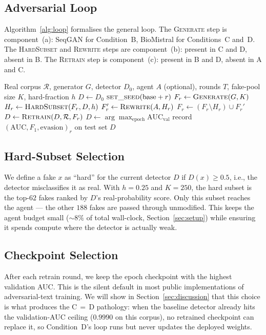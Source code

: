 \documentclass[conference]{IEEEtran}
\begin{document}
\subsection{Adversarial Loop}
\label{ssec:loop}

Algorithm~\ref{alg:loop} formalises the general loop. The
\textsc{Generate} step is component~(a): SeqGAN for Condition~B,
BioMistral for Conditions~C and~D. The \textsc{HardSubset} and
\textsc{Rewrite} steps are component~(b): present in C and D, absent in
B. The \textsc{Retrain} step is component~(c): present in B and D,
absent in A and C.

\begin{algorithm}[t]
\caption{BioShield adversarial loop}
\label{alg:loop}
\begin{algorithmic}[1]
\REQUIRE Real corpus $\mathcal{R}$, generator $G$, detector $D_0$,
agent $A$ (optional), rounds $T$, fake-pool size $K$, hard-fraction $h$
\STATE $D \leftarrow D_0$  
  \STATE $\textsc{set\_seed}(\text{base} + r)$
  \STATE $F_r \leftarrow \textsc{Generate}(G, K)$
    \STATE $H_r \leftarrow \textsc{HardSubset}(F_r, D, h)$
    \STATE $F_r' \leftarrow \textsc{Rewrite}(A, H_r)$
    \STATE $F_r \leftarrow (F_r \setminus H_r) \cup F_r'$
  \ENDIF
    \STATE $D \leftarrow \textsc{Retrain}(D, \mathcal{R}, F_r)$
    \STATE $D \leftarrow \arg\max_{\text{epoch}} \mathrm{AUC}_{\text{val}}$
  \ENDIF
  \STATE record $(\mathrm{AUC}, F_1, \mathrm{evasion})_r$ on test set
\ENDFOR
\RETURN $D$
\end{algorithmic}
\end{algorithm}

\subsection{Hard-Subset Selection}
We define a fake $x$ as ``hard'' for the current detector $D$ if
$D(x) \geq 0.5$, i.e., the detector misclassifies it as real. With
$h = 0.25$ and $K = 250$, the hard subset is the top-\(62\) fakes ranked by
$D$'s real-probability score. Only this subset reaches the agent — the
other \(188\) fakes are passed through unmodified. This keeps the
agent budget small (\(\sim\!8\%\) of total wall-clock,
Section~\ref{sec:setup}) while ensuring it spends compute where the
detector is actually weak.

\subsection{Checkpoint Selection}
\label{ssec:checkpoint}
After each retrain round, we keep the epoch checkpoint with the highest
validation AUC. This is the silent default in most public implementations
of adversarial-text training. We will show in Section~\ref{sec:discussion}
that this choice is what produces the C\,$=$\,D pathology: when the
baseline detector already hits the validation-AUC ceiling
(\(0.9990\) on this corpus), no retrained checkpoint can replace it, so
Condition~D's loop runs but never updates the deployed weights.
\end{document}
